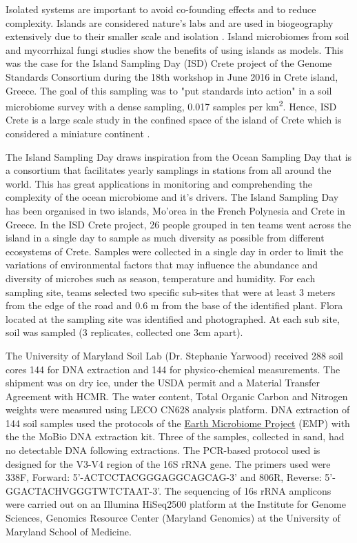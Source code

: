 Isolated systems are important to avoid co-founding effects and to reduce complexity.
Islands are considered nature's labs and are used in biogeography extensively due to their smaller scale and isolation \parencite{Whittaker2017}. 
Island microbiomes from soil \parencite{Li2020} and mycorrhizal fungi \parencite{Delavaux2021} studies
show the benefits of using islands as models.
This was the case for the Island Sampling Day (ISD) Crete project
of the Genome Standards Consortium \parencite{Field2011}
during the 18th workshop in June 2016 in Crete island, Greece. The goal of this sampling was to "put standards into action"
in a soil microbiome survey with a dense sampling, 0.017 samples per km\textsuperscript{2}.
Hence, ISD Crete is a large scale study in the confined space of the island of Crete which 
is considered a miniature continent \parencite{Vogiatzakis2008_crete}.

The Island Sampling Day draws inspiration from the Ocean Sampling Day \parencite{kopf_2015} that is a
consortium that facilitates yearly samplings in stations from all around the world.
This has great applications in monitoring and comprehending the complexity of the ocean microbiome and it’s drivers.
The Island Sampling Day has been organised in two islands, Mo'orea in the French Polynesia and Crete in Greece.
In the ISD Crete project, 26 people grouped in ten teams went across the island
in a single day to sample as much diversity as possible from different ecosystems of Crete. 
Samples were collected in a single day in order to limit the variations of environmental
factors that may influence the abundance and diversity of microbes such as season,
temperature and humidity.
For each sampling site, teams selected two specific sub-sites that were
at least 3 meters from the edge of the road and 0.6 m from the base of
the identified plant. Flora located at the sampling site was
identified and photographed.
At each sub site, soil was sampled (3 replicates, collected one 3cm apart). 

The University of Maryland Soil Lab (Dr. Stephanie Yarwood) received 288 soil cores
144 for DNA extraction and 144 for physico-chemical measurements. The shipment was on dry ice,
under the USDA permit and a Material Transfer Agreement with HCMR.
The water content, Total Organic Carbon and Nitrogen weights were measured using LECO CN628 analysis platform.
DNA extraction of 144 soil samples used the protocols of the \href{https://www.protocols.io/view/emp-16s-illumina-amplicon-protocol-cpisvkee}{Earth Microbiome Project} (EMP)
with the the MoBio DNA extraction kit. Three of the samples, collected in sand, had no detectable DNA
following extractions.
The PCR-based protocol used is designed for the V3-V4 region of the 16S rRNA gene.
The primers used were 338F, Forward: 5'-ACTCCTACGGGAGGCAGCAG-3' and  806R, Reverse: 5'-GGACTACHVGGGTWTCTAAT-3'.
The sequencing of 16s rRNA amplicons were carried out on an Illumina HiSeq2500 platform
at the Institute for Genome Sciences, Genomics Resource Center (Maryland Genomics) at the University of Maryland School of Medicine.

